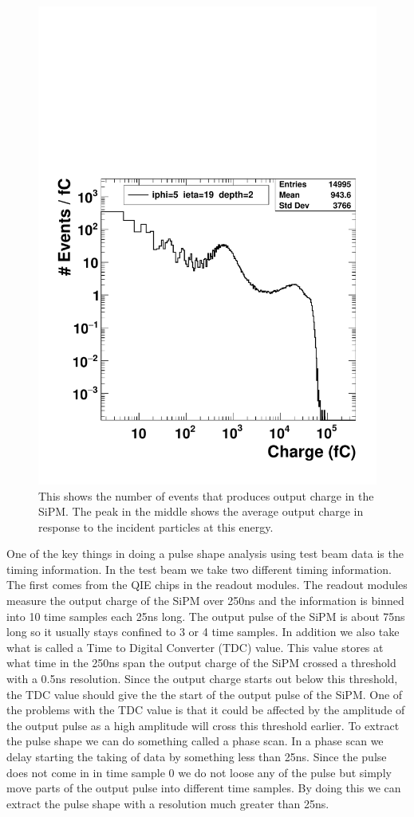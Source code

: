 \begin{figure}
\centering
\includegraphics[width=0.7\linewidth]{Figures/pioncharge.pdf}
\caption{This shows the number of events that produces output charge in the SiPM. The peak in the middle shows the average output charge in response to the incident particles at this energy.}
\label{fig:pioncharge}
\end{figure}


One of the key things in doing a pulse shape analysis using test beam data is the timing information. In the test beam we take two different timing information. The first comes from the QIE chips in the readout modules. The readout modules measure the output charge of the SiPM over 250ns and the information is binned into 10 time samples each 25ns long. The output pulse of the SiPM is about 75ns long so it usually stays confined to 3 or 4 time samples. In addition we also take what is called a Time to Digital Converter (TDC) value. This value stores at what time in the 250ns span the output charge of the SiPM crossed a threshold with a 0.5ns resolution. Since the output charge starts out below this threshold, the TDC value should give the the start of the output pulse of the SiPM. One of the problems with the TDC value is that it could be affected by the amplitude of the output pulse as a high amplitude will cross this threshold earlier. To extract the pulse shape we can do something called a phase scan. In a phase scan we delay starting the taking of data by something less than 25ns. Since the pulse does not come in in time sample 0 we do not loose any of the pulse but simply move parts of the output pulse into different time samples. By doing this we can extract the pulse shape with a resolution much greater than 25ns. 

